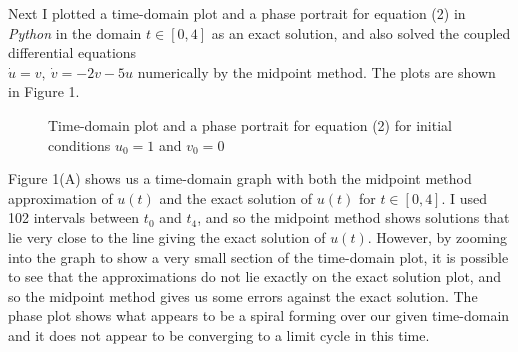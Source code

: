 \documentclass[11pt,a4paper]{article}
\begin{document}
\par
Next I plotted a time-domain plot and a phase portrait for equation (2) in \textit{Python} in the domain $t \in [0,4]$ as an exact solution, and also solved the coupled differential equations\\ $\dot{u}=v, \ \dot{v}={-2v}-5u$ numerically by the midpoint method. The plots are shown in Figure 1.

\begin{figure}[h]
\caption{Time-domain plot and a phase portrait for equation (2) for initial conditions $u_0=1$ and $v_0=0$}
\centering
{}
\hfill
{}
\end{figure}

Figure 1(A) shows us a time-domain graph with both the midpoint method approximation of $u(t)$ and the exact solution of $u(t)$ for $t \in [0,4]$. I used 102 intervals between $t_0$ and $t_4$, and so the midpoint method shows solutions that lie very close to the line giving the exact solution of $u(t).$ However, by zooming into the graph to show a very small section of the time-domain plot, it is possible to see that the approximations do not lie exactly on the exact solution plot, and so the midpoint method gives us some errors against the exact solution. The phase plot shows what appears to be a spiral forming over our given time-domain and it does not appear to be converging to a limit cycle in this time. 
\end{document}
